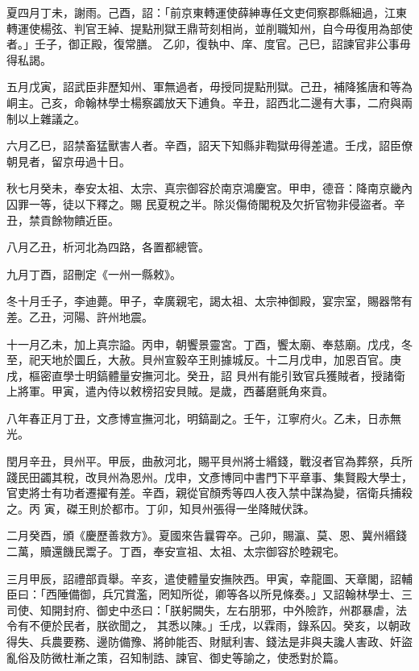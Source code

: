 \begin{pinyinscope}
 夏四月丁未，謝雨。己酉，詔：「前京東轉運使薛紳專任文吏伺察郡縣細過，江東轉運使楊弦、判官王綽、提點刑獄王鼎苛刻相尚，並削職知州，自今毋復用為部使者。」壬子，御正殿，復常膳。
 乙卯，復執中、庠、度官。己巳，詔諫官非公事毋得私謁。



 五月戊寅，詔武臣非歷知州、軍無過者，毋授同提點刑獄。己丑，補降猺唐和等為峒主。己亥，命翰林學士楊察蠲放天下逋負。辛丑，詔西北二邊有大事，二府與兩制以上雜議之。



 六月乙巳，詔禁畜猛獸害人者。辛酉，詔天下知縣非鞫獄毋得差遣。壬戌，詔臣僚朝見者，留京毋過十日。



 秋七月癸未，奉安太祖、太宗、真宗御容於南京鴻慶宮。甲申，德音：降南京畿內囚罪一等，徒以下釋之。賜
 民夏稅之半。除災傷倚閣稅及欠折官物非侵盜者。辛丑，禁貢餘物饋近臣。



 八月乙丑，析河北為四路，各置都總管。



 九月丁酉，詔刪定《一州一縣敕》。



 冬十月壬子，李迪薨。甲子，幸廣親宅，謁太祖、太宗神御殿，宴宗室，賜器幣有差。乙丑，河陽、許州地震。



 十一月乙未，加上真宗謚。丙申，朝饗景靈宮。丁酉，饗太廟、奉慈廟。戊戌，冬至，祀天地於圜丘，大赦。貝州宣毅卒王則據城反。十二月戊申，加恩百官。庚戌，樞密直學士明鎬體量安撫河北。癸丑，詔
 貝州有能引致官兵獲賊者，授諸衛上將軍。甲寅，遣內侍以敕榜招安貝賊。是歲，西蕃磨氈角來貢。



 八年春正月丁丑，文彥博宣撫河北，明鎬副之。壬午，江寧府火。乙未，日赤無光。



 閏月辛丑，貝州平。甲辰，曲赦河北，賜平貝州將士緡錢，戰沒者官為葬祭，兵所踐民田蠲其稅，改貝州為恩州。戊申，文彥博同中書門下平章事、集賢殿大學士，官吏將士有功者遷擢有差。辛酉，親從官顏秀等四人夜入禁中謀為變，宿衛兵捕殺之。丙
 寅，磔王則於都市。丁卯，知貝州張得一坐降賊伏誅。



 二月癸酉，頒《慶歷善救方》。夏國來告曩霄卒。己卯，賜瀛、莫、恩、冀州緡錢二萬，贖還饑民鬻子。丁酉，奉安宣祖、太祖、太宗御容於睦親宅。



 三月甲辰，詔禮部貢舉。辛亥，遣使體量安撫陜西。甲寅，幸龍圖、天章閣，詔輔臣曰：「西陲備御，兵冗賞濫，罔知所從，卿等各以所見條奏。」又詔翰林學士、三司使、知開封府、御史中丞曰：「朕躬闕失，左右朋邪，中外險詐，州郡暴虐，法令有不便於民者，朕欲聞之，
 其悉以陳。」壬戌，以霖雨，錄系囚。癸亥，以朝政得失、兵農要務、邊防備豫、將帥能否、財賦利害、錢法是非與夫讒人害政、奸盜亂俗及防微杜漸之策，召知制誥、諫官、御史等諭之，使悉對於篇。




\end{pinyinscope}

